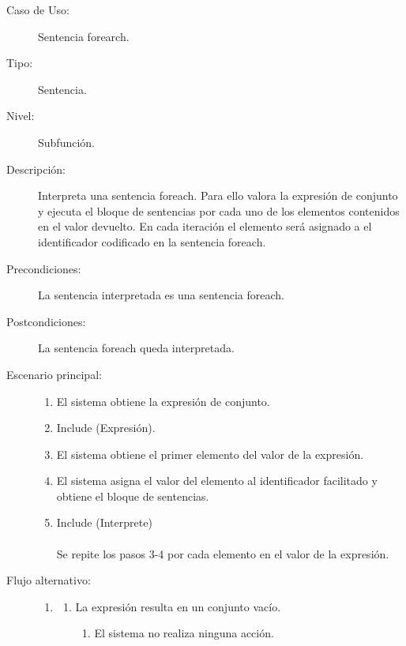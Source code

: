 \begin{framed}
\FloatBarrier
\begin{description}
   \item[Caso de Uso:]  Sentencia forearch.
   \item [Tipo:] Sentencia.
   \item[Nivel:]  Subfunción.
   \item[Descripción:] 
   Interpreta una sentencia foreach. Para ello valora la expresión de conjunto
   y ejecuta el bloque de sentencias por cada uno de los elementos contenidos en el valor devuelto.
   En cada iteración  el elemento será asignado a el identificador codificado en la sentencia foreach.
   \item[Precondiciones:] 
   La sentencia interpretada es una sentencia foreach.
   \item[Postcondiciones:] 
   La sentencia foreach queda interpretada.   
   \item[Escenario principal:] \hfill
   \begin{enumerate}
   \item El sistema obtiene la expresión de conjunto.
   \item Include (Expresión).
   \item El sistema obtiene el primer elemento del valor de la expresión.
   \item El sistema asigna el valor del elemento al identificador facilitado y obtiene el bloque de sentencias.
   \item Include (Interprete) \\\\ \hfill
   Se repite los pasos 3-4 por cada elemento en el valor de la expresión.
   \end{enumerate}
   \item[Flujo alternativo:] \hfill 
   \begin{enumerate} \itemsep1pt \parskip0pt 
   \setcounter{enumi}{2}
   \renewcommand{\labelenumi}{}
   \renewcommand{\labelenumiii}{\arabic{enumiii}.}
   \renewcommand{\labelenumii}{\arabic{enumi}\alph{enumii}.}
      \item 
      \begin {enumerate}
         \setcounter{enumii}{0}
         \item La expresión resulta en un conjunto vacío.
         \begin{enumerate}
         \item El sistema no realiza ninguna acción.
         \end{enumerate}

\end{enumerate}
\end{enumerate}
\end{description}
\end{framed}
